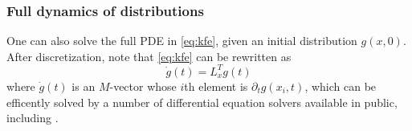 \documentclass[11pt]{article}
\begin{document}
\subsubsection{Full dynamics of distributions}
One can also solve the full PDE in \eqref{eq:kfe}, given an initial distribution $g(x, 0)$. After discretization, note that \eqref{eq:kfe} can be rewritten as
\begin{equation}\label{eq:kfe-discretized}
\dot{g}(t) = L^T_x g(t)
\end{equation}
where $\dot{g}(t)$ is an $M$-vector whose $i$th element is $\partial_{t} g(x_i, t)$, which can be efficently solved by a number of differential equation solvers available in public, including \cite{rackauckas17}.

\newpage

\end{document}
